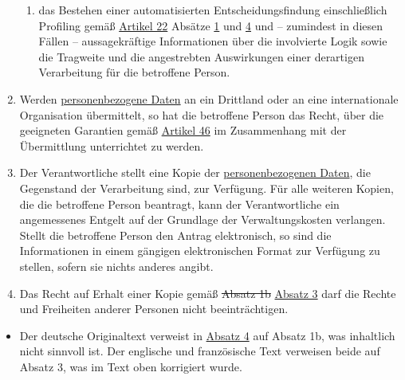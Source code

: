 \begin{enumerate}
\begin{enumerate}
    \item das Bestehen einer automatisierten Entscheidungsfindung einschließlich Profiling gemäß \hyperref[ch:22]
     {Artikel 22} Absätze \hyperref[itm:22-1]{1} und \hyperref[itm:22-4]{4} und -- zumindest in diesen Fällen --
     aussagekräftige Informationen über die involvierte Logik sowie die Tragweite und die angestrebten Auswirkungen
     einer derartigen Verarbeitung für die betroffene Person.
    \label{itm:15-1h}

  \end{enumerate}

  \item Werden \hyperref[itm:04-1]{personenbezogene Daten} an ein Drittland oder an eine internationale Organisation übermittelt, so hat die
   betroffene Person das Recht, über die geeigneten Garantien gemäß \hyperref[ch:46]{Artikel 46} im Zusammenhang mit der
   Übermittlung unterrichtet zu werden.
  \label{itm:15-2}

  \item Der Verantwortliche stellt eine Kopie der \hyperref[itm:04-1]{personenbezogenen Daten}, die Gegenstand der Verarbeitung sind, zur
   Verfügung. Für alle weiteren Kopien, die die betroffene Person beantragt, kann der Verantwortliche ein angemessenes
   Entgelt auf der Grundlage der Verwaltungskosten verlangen. Stellt die betroffene Person den Antrag elektronisch, so
   sind die Informationen in einem gängigen elektronischen Format zur Verfügung zu stellen, sofern sie nichts anderes
   angibt.
  \label{itm:15-3}

  \item Das Recht auf Erhalt einer Kopie gemäß \sout{Absatz 1b} \hyperref[itm:15-3]{Absatz 3} darf die Rechte und
   Freiheiten anderer Personen nicht beeinträchtigen.
  \label{itm:15-4}

\end{enumerate}


\begin{itemize}

  \item Der deutsche Originaltext verweist in \hyperref[itm:15-4]{Absatz 4} auf Absatz 1b, was inhaltlich nicht sinnvoll
   ist. Der englische und französische Text verweisen beide auf Absatz 3, was im Text oben korrigiert wurde.

\end{itemize}

